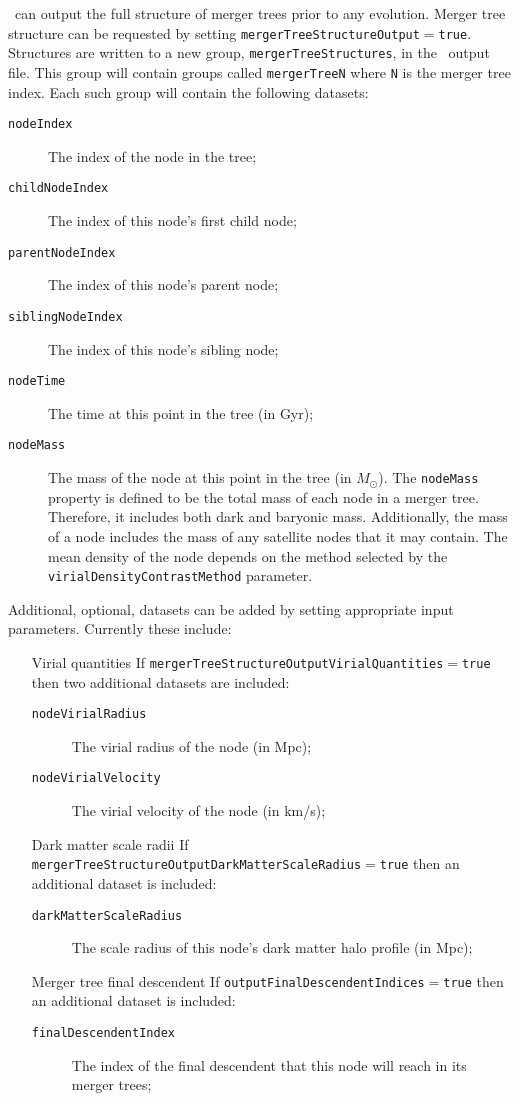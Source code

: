 \glc\ can output the full structure of merger trees prior to any evolution. Merger tree structure can be requested by setting {\tt mergerTreeStructureOutput}$=${\tt true}. Structures are written to a new group, {\tt mergerTreeStructures}, in the \glc\ output file. This group will contain groups called {\tt mergerTreeN} where {\tt N} is the merger tree index. Each such group will contain the following datasets:
\begin{description}
 \item [{\tt nodeIndex}] The index of the node in the tree;
 \item [{\tt childNodeIndex}] The index of this node's first child node;
 \item [{\tt parentNodeIndex}] The index of this node's parent node;
 \item [{\tt siblingNodeIndex}] The index of this node's sibling node;
 \item [{\tt nodeTime}] The time at this point in the tree (in Gyr);
 \item [{\tt nodeMass}] The mass of the node at this point in the tree (in $M_\odot$). The {\tt nodeMass} property is defined to be the total mass of each node in a merger tree. Therefore, it includes both dark and baryonic mass. Additionally, the mass of a node includes the mass of any satellite nodes that it may contain. The mean density of the node depends on the method selected by the {\tt virialDensityContrastMethod} parameter.
\end{description}
Additional, optional, datasets can be added by setting appropriate input parameters. Currently these include:
\begin{itemize}
 \item [Virial quantities] If {\tt mergerTreeStructureOutputVirialQuantities}$=${\tt true} then two additional datasets are included:
 \begin{description}
  \item [{\tt nodeVirialRadius}] The virial radius of the node (in Mpc);
  \item [{\tt nodeVirialVelocity}] The virial velocity of the node (in km/s);
 \end{description}
 \item [Dark matter scale radii] If {\tt mergerTreeStructureOutputDarkMatterScaleRadius}$=${\tt true} then an additional dataset is included:
 \begin{description}
  \item [{\tt darkMatterScaleRadius}] The scale radius of this node's dark matter halo profile (in Mpc);
 \end{description}
 \item [Merger tree final descendent] If {\tt outputFinalDescendentIndices}$=${\tt true} then an additional dataset is included:
 \begin{description}
  \item [{\tt finalDescendentIndex}] The index of the final descendent that this node will reach in its merger trees;
 \end{description}
\end{itemize}

